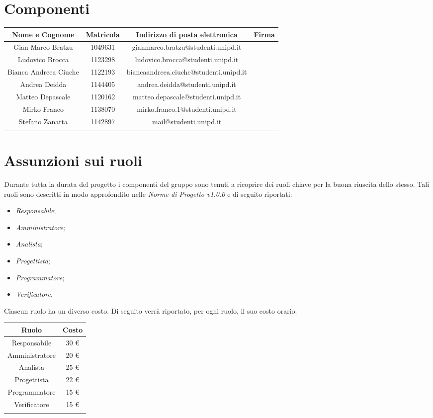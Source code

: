\section{Componenti}

		\begin{tabularx}{\textwidth}{|C|c|c|C|}
			\hline
			\textbf{Nome e Cognome} & \textbf{Matricola} & \textbf{Indirizzo di posta elettronica} & \textbf{Firma} \\
			\hline 
			Gian Marco Bratzu & 1049631 &gianmarco.bratzu@studenti.unipd.it & \\
			\hline
			Ludovico Brocca & 1123298 & ludovico.brocca@studenti.unipd.it & \\
			\hline
			Bianca Andreea Ciuche & 1122193 & biancaandreea.ciuche@studenti.unipd.it & \\
			\hline
			Andrea Deidda & 1144405 & andrea.deidda@studenti.unipd.it & \\
			\hline
			Matteo Depascale & 1120162 & matteo.depascale@studenti.unipd.it & \\
			\hline
			Mirko Franco & 1138070 &  mirko.franco.1@studenti.unipd.it & \\
			\hline
			Stefano Zanatta & 1142897 & mail@studenti.unipd.it & \\
			\hline
			\caption{Componenti}
		\end{tabularx}
			

\section{Assunzioni sui ruoli}
	Durante tutta la durata del progetto i componenti del gruppo sono tenuti a ricoprire dei ruoli chiave per la buona riuscita dello stesso.
	Tali ruoli sono descritti in modo approfondito nelle \textit{Norme di Progetto v1.0.0} e di seguito riportati:
	\begin{itemize}
		\item \textit{Responsabile};
		\item \textit{Amministratore};
		\item \textit{Analista};
		\item \textit{Progettista};
		\item \textit{Programmatore};
		\item \textit{Verificatore}.
	\end{itemize}
	Ciascun ruolo ha un diverso costo. Di seguito verrà riportato, per ogni ruolo, il suo costo orario:

		\begin{tabularx}{\textwidth}{|c|c|}
			\hline
			\textbf{Ruolo} & \textbf{Costo} \\
			\hline
			Responsabile & 30 \euro \\
			Amministratore & 20 \euro \\
			Analista & 25 \euro \\
			Progettista & 22 \euro \\
			Programmatore & 15 \euro \\
			Verificatore & 15 \euro \\
			\hline
			\caption{Costi per ruolo}
		\end{tabularx}

